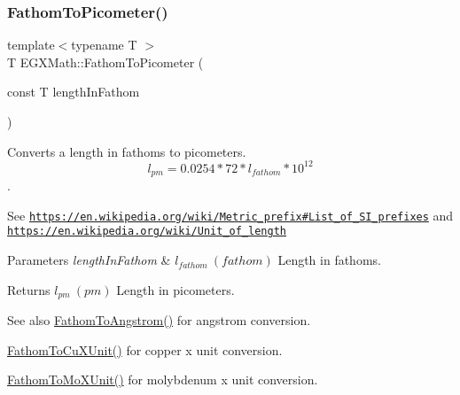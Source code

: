\subsubsection{\texorpdfstring{Fathom\+To\+Picometer()}{FathomToPicometer()}}
{\footnotesize\ttfamily template$<$typename T $>$ \\
T E\+G\+X\+Math\+::\+Fathom\+To\+Picometer (\begin{DoxyParamCaption}\item[{const T}]{length\+In\+Fathom }\end{DoxyParamCaption})}



Converts a length in fathoms to picometers. \[ l_{pm}=0.0254 * 72 * l_{fathom} * 10^{12} \]. 

See \href{https://en.wikipedia.org/wiki/Metric_prefix#List_of_SI_prefixes}{\tt https\+://en.\+wikipedia.\+org/wiki/\+Metric\+\_\+prefix\#\+List\+\_\+of\+\_\+\+S\+I\+\_\+prefixes} and \href{https://en.wikipedia.org/wiki/Unit_of_length}{\tt https\+://en.\+wikipedia.\+org/wiki/\+Unit\+\_\+of\+\_\+length} 
\begin{DoxyParams}{Parameters}
{\em length\+In\+Fathom} & $ l_{fathom}\ (fathom)$ Length in fathoms. \\
\hline
\end{DoxyParams}
\begin{DoxyReturn}{Returns}
$ l_{pm}\ (pm)$ Length in picometers. 
\end{DoxyReturn}
\begin{DoxySeeAlso}{See also}
\mbox{\hyperlink{group___e_g_x_math-_conversions-_length_conversions-_nautical-_fathom-_non-_s_i_gac03859840078c2a19cbf1f79bcf2b919}{Fathom\+To\+Angstrom()}} for angstrom conversion. 

\mbox{\hyperlink{group___e_g_x_math-_conversions-_length_conversions-_nautical-_fathom-_non-_s_i_ga6692d3fad4af03d78145e34bf0a6c2ac}{Fathom\+To\+Cu\+X\+Unit()}} for copper x unit conversion. 

\mbox{\hyperlink{group___e_g_x_math-_conversions-_length_conversions-_nautical-_fathom-_non-_s_i_ga1e69cf778d1b7f72cd015b6cc81fc71c}{Fathom\+To\+Mo\+X\+Unit()}} for molybdenum x unit conversion. 
\end{DoxySeeAlso}
\mbox{\label{group___e_g_x_math-_conversions-_length_conversions-_nautical-_fathom-_s_i_gade17d568b89bc6b268ca6acb38ca8863}} 
